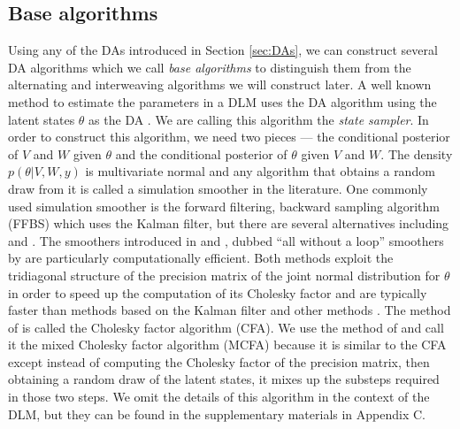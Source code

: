 \documentclass[12pt]{article}
\begin{document}
\subsection{Base algorithms}\label{sec:Algs:base}
Using any of the DAs introduced in Section \ref{sec:DAs}, we can construct several DA algorithms which we call {\it base algorithms} to distinguish them from the alternating and interweaving algorithms we will construct later. A well known method to estimate the parameters in a DLM uses the DA algorithm using the latent states $\theta$ as the DA \citep{fruhwirth1994data,carter1994gibbs}. We are calling this algorithm the {\it state sampler}. In order to construct this algorithm, we need two pieces --- the conditional posterior of $V$ and $W$ given $\theta$ and the conditional posterior of $\theta$ given $V$ and $W$. The density $p(\theta|V,W,y)$ is multivariate normal and any algorithm that obtains a random draw from it is called a simulation smoother in the literature. One commonly used simulation smoother is the forward filtering, backward sampling algorithm (FFBS) \citep{fruhwirth1994data,carter1994gibbs} which uses the Kalman filter, but there are several alternatives including \citet{koopman1993disturbance} and \citet{de1995simulation}. The smoothers introduced in \citet{mccausland2011simulation} and \citet{rue2001fast}, dubbed ``all without a loop'' smoothers by \citet{kastner2013ancillarity} are particularly computationally efficient. Both methods exploit the tridiagonal structure of the precision matrix of the joint normal distribution for $\theta$ in order to speed up the computation of its Cholesky factor and are typically faster than methods based on the Kalman filter and other methods \citep{mccausland2011simulation}. The method of \citet{rue2001fast} is called the Cholesky factor algorithm (CFA). We use the method of \citet{mccausland2011simulation} and call it the mixed Cholesky factor algorithm (MCFA) because it is similar to the CFA except instead of computing the Cholesky factor of the precision matrix, then obtaining a random draw of the latent states, it mixes up the substeps required in those two steps. We omit the details of this algorithm in the context of the DLM, but they can be found in the supplementary materials in Appendix C.
\end{document}
